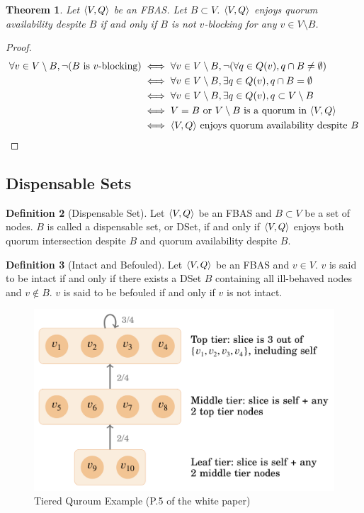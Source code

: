 \documentclass[12pt, psamsfonts]{amsart}
\newtheorem{thm}{Theorem}[subsection]
\theoremstyle{definition}
\newtheorem{defn}[thm]{Definition}
\theoremstyle{remark}
\numberwithin{equation}{subsection}
\begin{document}
\begin{thm}\label{quorum_availability_v_blocking}
    Let $\ev{V, Q}$ be an FBAS\@.
    Let $B \subset V$.
    $\ev{V, Q}$ enjoys quorum availability despite $B$ if and only if $B$ is not $v$-blocking for any $v \in V \setminus B$.
\end{thm}

\begin{proof}
    \begin{align*}
        \forall v \in V \setminus B, \neg(\text{$B$ is $v$-blocking})
            &\iff \forall v \in V \setminus B, \neg(\forall q \in Q(v), q \cap B \ne \emptyset) \\
            &\iff \forall v \in V \setminus B, \exists q \in Q(v), q \cap B = \emptyset \\
            &\iff \forall v \in V \setminus B, \exists q \in Q(v), q \subset V \setminus B \\
            &\iff \text{$V = B$ or $V \setminus B$ is a quorum in $\ev{V, Q}$} \\
            &\iff \text{$\ev{V, Q}$ enjoys quorum availability despite $B$}
    \end{align*}
\end{proof}

\subsection{Dispensable Sets}

\begin{defn}[Dispensable Set]\label{def_dset}
    Let $\ev{V, Q}$ be an FBAS and $B \subset V$ be a set of nodes.
    $B$ is called a dispensable set, or DSet, if and only if $\ev{V, Q}$ enjoys both quorum intersection despite $B$ and quorum availability despite $B$.
\end{defn}

\begin{defn}[Intact and Befouled]\label{def_intact_befouled}
    Let $\ev{V, Q}$ be an FBAS and $v \in V$.
    $v$ is said to be intact if and only if there exists a DSet $B$ containing all ill-behaved nodes and $v \notin B$.
    $v$ is said to be befouled if and only if $v$ is not intact.
\end{defn}

\begin{figure}[!htb]
    \includegraphics[width=.5\linewidth]{img/tiered_quorum_example.jpeg}
        \caption{Tiered Quroum Example (P.5 of the white paper)}
    \label{fig:tiered_quorum_example}
\end{figure}
\end{document}
